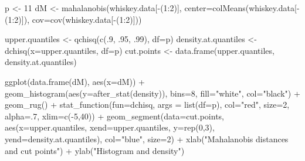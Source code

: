 \documentclass[
  letterpaper,
  DIV=11,
  numbers=noendperiod]{scrartcl}
\newenvironment{Shaded}{\begin{snugshade}}{\end{snugshade}}
\newcommand{\AttributeTok}[1]{\textcolor[rgb]{0.40,0.45,0.13}{#1}}
\newcommand{\DecValTok}[1]{\textcolor[rgb]{0.68,0.00,0.00}{#1}}
\newcommand{\FunctionTok}[1]{\textcolor[rgb]{0.28,0.35,0.67}{#1}}
\newcommand{\NormalTok}[1]{\textcolor[rgb]{0.00,0.23,0.31}{#1}}
\newcommand{\OtherTok}[1]{\textcolor[rgb]{0.00,0.23,0.31}{#1}}
\newcommand{\SpecialCharTok}[1]{\textcolor[rgb]{0.37,0.37,0.37}{#1}}
\newcommand{\StringTok}[1]{\textcolor[rgb]{0.13,0.47,0.30}{#1}}
\begin{document}
\begin{Shaded}
\begin{Highlighting}[]
\NormalTok{p }\OtherTok{\textless{}{-}} \DecValTok{11}
\NormalTok{dM }\OtherTok{\textless{}{-}} \FunctionTok{mahalanobis}\NormalTok{(whiskey.data[}\SpecialCharTok{{-}}\NormalTok{(}\DecValTok{1}\SpecialCharTok{:}\DecValTok{2}\NormalTok{)], }\AttributeTok{center=}\FunctionTok{colMeans}\NormalTok{(whiskey.data[}\SpecialCharTok{{-}}\NormalTok{(}\DecValTok{1}\SpecialCharTok{:}\DecValTok{2}\NormalTok{)]), }\AttributeTok{cov=}\FunctionTok{cov}\NormalTok{(whiskey.data[}\SpecialCharTok{{-}}\NormalTok{(}\DecValTok{1}\SpecialCharTok{:}\DecValTok{2}\NormalTok{)]))}

\NormalTok{upper.quantiles }\OtherTok{\textless{}{-}} \FunctionTok{qchisq}\NormalTok{(}\FunctionTok{c}\NormalTok{(.}\DecValTok{9}\NormalTok{, .}\DecValTok{95}\NormalTok{, .}\DecValTok{99}\NormalTok{), }\AttributeTok{df=}\NormalTok{p)}
\NormalTok{density.at.quantiles }\OtherTok{\textless{}{-}} \FunctionTok{dchisq}\NormalTok{(}\AttributeTok{x=}\NormalTok{upper.quantiles, }\AttributeTok{df=}\NormalTok{p)}
\NormalTok{cut.points }\OtherTok{\textless{}{-}} \FunctionTok{data.frame}\NormalTok{(upper.quantiles, density.at.quantiles)}

\FunctionTok{ggplot}\NormalTok{(}\FunctionTok{data.frame}\NormalTok{(dM), }\FunctionTok{aes}\NormalTok{(}\AttributeTok{x=}\NormalTok{dM)) }\SpecialCharTok{+}
    \FunctionTok{geom\_histogram}\NormalTok{(}\FunctionTok{aes}\NormalTok{(}\AttributeTok{y=}\FunctionTok{after\_stat}\NormalTok{(density)), }\AttributeTok{bins=}\DecValTok{8}\NormalTok{,}
                   \AttributeTok{fill=}\StringTok{"white"}\NormalTok{, }\AttributeTok{col=}\StringTok{"black"}\NormalTok{) }\SpecialCharTok{+}
    \FunctionTok{geom\_rug}\NormalTok{() }\SpecialCharTok{+}
    \FunctionTok{stat\_function}\NormalTok{(}\AttributeTok{fun=}\NormalTok{dchisq, }\AttributeTok{args =} \FunctionTok{list}\NormalTok{(}\AttributeTok{df=}\NormalTok{p),}
                  \AttributeTok{col=}\StringTok{"red"}\NormalTok{, }\AttributeTok{size=}\DecValTok{2}\NormalTok{, }\AttributeTok{alpha=}\NormalTok{.}\DecValTok{7}\NormalTok{, }\AttributeTok{xlim=}\FunctionTok{c}\NormalTok{(}\SpecialCharTok{{-}}\DecValTok{5}\NormalTok{,}\DecValTok{40}\NormalTok{)) }\SpecialCharTok{+}
    \FunctionTok{geom\_segment}\NormalTok{(}\AttributeTok{data=}\NormalTok{cut.points,}
                 \FunctionTok{aes}\NormalTok{(}\AttributeTok{x=}\NormalTok{upper.quantiles, }\AttributeTok{xend=}\NormalTok{upper.quantiles,}
                     \AttributeTok{y=}\FunctionTok{rep}\NormalTok{(}\DecValTok{0}\NormalTok{,}\DecValTok{3}\NormalTok{), }\AttributeTok{yend=}\NormalTok{density.at.quantiles),}
                 \AttributeTok{col=}\StringTok{"blue"}\NormalTok{, }\AttributeTok{size=}\DecValTok{2}\NormalTok{) }\SpecialCharTok{+}
    \FunctionTok{xlab}\NormalTok{(}\StringTok{"Mahalanobis distances and cut points"}\NormalTok{) }\SpecialCharTok{+}
    \FunctionTok{ylab}\NormalTok{(}\StringTok{"Histogram and density"}\NormalTok{)}
\end{Highlighting}
\end{Shaded}
\end{document}

